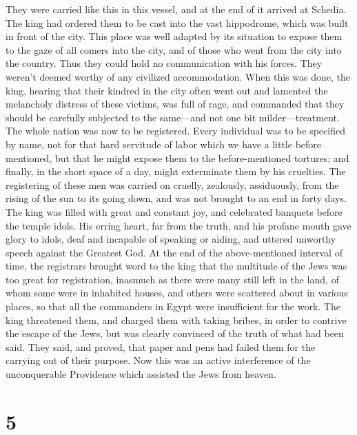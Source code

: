  They were carried like this in this vessel, and at the end
of it arrived at Schedia. The king had ordered them to be cast into the
vast hippodrome, which was built in front of the city. This place was
well adapted by its situation to expose them to the gaze of all comers
into the city, and of those who went from the city into the country.
Thus they could hold no communication with his forces. They weren't
deemed worthy of any civilized accommodation.  When this
was done, the king, hearing that their kindred in the city often went
out and lamented the melancholy distress of these victims, 
was full of rage, and commanded that they should be carefully subjected
to the same---and not one bit milder---treatment.  The
whole nation was now to be registered. Every individual was to be
specified by name, not for that hard servitude of labor which we have a
little before mentioned, but that he might expose them to the
before-mentioned tortures; and finally, in the short space of a day,
might exterminate them by his cruelties.  The registering
of these men was carried on cruelly, zealously, assiduously, from the
rising of the sun to its going down, and was not brought to an end in
forty days.  The king was filled with great and constant
joy, and celebrated banquets before the temple idols. His erring heart,
far from the truth, and his profane mouth gave glory to idols, deaf and
incapable of speaking or aiding, and uttered unworthy speech against the
Greatest God.  At the end of the above-mentioned interval
of time, the registrars brought word to the king that the multitude of
the Jews was too great for registration,  inasmuch as there
were many still left in the land, of whom some were in inhabited houses,
and others were scattered about in various places, so that all the
commanders in Egypt were insufficient for the work.  The
king threatened them, and charged them with taking bribes, in order to
contrive the escape of the Jews, but was clearly convinced of the truth
of what had been said.  They said, and proved, that paper
and pens had failed them for the carrying out of their purpose.
 Now this was an active interference of the unconquerable
Providence which assisted the Jews from heaven.

\hypertarget{section-4}{%
\section{5}\label{section-4}}

